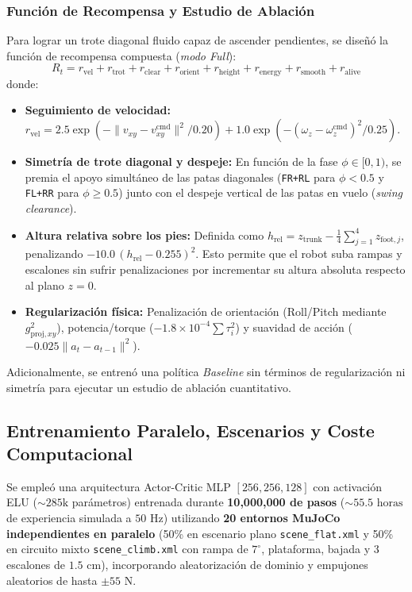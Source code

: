\documentclass[12pt,a4paper]{article}
\begin{document}
\subsubsection{Función de Recompensa y Estudio de Ablación}
Para lograr un trote diagonal fluido capaz de ascender pendientes, se diseñó la función de recompensa compuesta (\textit{modo Full}):
\begin{equation}
    R_t = r_{\text{vel}} + r_{\text{trot}} + r_{\text{clear}} + r_{\text{orient}} + r_{\text{height}} + r_{\text{energy}} + r_{\text{smooth}} + r_{\text{alive}}
\end{equation}
donde:
\begin{itemize}
    \item \textbf{Seguimiento de velocidad:} $r_{\text{vel}} = 2.5\exp(-\|v_{xy} - v_{xy}^{\text{cmd}}\|^2/0.20) + 1.0\exp(-(\omega_z - \omega_z^{\text{cmd}})^2/0.25)$.
    \item \textbf{Simetría de trote diagonal y despeje:} En función de la fase $\phi \in [0, 1)$, se premia el apoyo simultáneo de las patas diagonales (\texttt{FR+RL} para $\phi < 0.5$ y \texttt{FL+RR} para $\phi \ge 0.5$) junto con el despeje vertical de las patas en vuelo (\textit{swing clearance}).
    \item \textbf{Altura relativa sobre los pies:} Definida como $h_{\text{rel}} = z_{\text{trunk}} - \frac{1}{4}\sum_{j=1}^4 z_{\text{foot}, j}$, penalizando $-10.0\,(h_{\text{rel}} - 0.255)^2$. Esto permite que el robot suba rampas y escalones sin sufrir penalizaciones por incrementar su altura absoluta respecto al plano $z=0$.
    \item \textbf{Regularización física:} Penalización de orientación (Roll/Pitch mediante $g_{\text{proj}, xy}^2$), potencia/torque ($-1.8\times 10^{-4}\sum \tau_i^2$) y suavidad de acción ($-0.025\|a_t - a_{t-1}\|^2$).
\end{itemize}
Adicionalmente, se entrenó una política \textit{Baseline} sin términos de regularización ni simetría para ejecutar un estudio de ablación cuantitativo.

\subsection{Entrenamiento Paralelo, Escenarios y Coste Computacional}
Se empleó una arquitectura Actor-Critic MLP $[256, 256, 128]$ con activación ELU ($\sim 285\text{k}$ parámetros) entrenada durante \textbf{10,000,000 de pasos} ($\sim 55.5\text{ horas}$ de experiencia simulada a $50\text{ Hz}$) utilizando \textbf{20 entornos MuJoCo independientes en paralelo} (50\% en escenario plano \texttt{scene\_flat.xml} y 50\% en circuito mixto \texttt{scene\_climb.xml} con rampa de $7^\circ$, plataforma, bajada y 3 escalones de $1.5\text{ cm}$), incorporando aleatorización de dominio y empujones aleatorios de hasta $\pm 55\text{ N}$.
\end{document}

